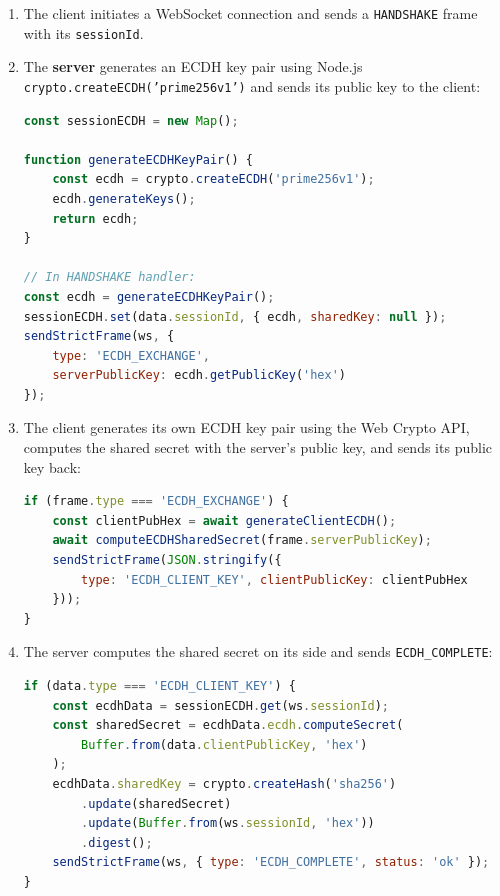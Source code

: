 \documentclass[12pt,a4paper]{article}
\begin{document}
\begin{enumerate}
    \item The client initiates a WebSocket connection and sends a \texttt{HANDSHAKE} frame with its \texttt{sessionId}.
    \item The \textbf{server} generates an ECDH key pair using Node.js \texttt{crypto.createECDH('prime256v1')} and sends its public key to the client:
    \begin{lstlisting}[language=JavaScript, caption=Server-side ECDH generation (server.js --- BEFORE PATCH)]
const sessionECDH = new Map();

function generateECDHKeyPair() {
    const ecdh = crypto.createECDH('prime256v1');
    ecdh.generateKeys();
    return ecdh;
}

// In HANDSHAKE handler:
const ecdh = generateECDHKeyPair();
sessionECDH.set(data.sessionId, { ecdh, sharedKey: null });
sendStrictFrame(ws, {
    type: 'ECDH_EXCHANGE',
    serverPublicKey: ecdh.getPublicKey('hex')
});
    \end{lstlisting}

    \item The client generates its own ECDH key pair using the Web Crypto API, computes the shared secret with the server's public key, and sends its public key back:
    \begin{lstlisting}[language=JavaScript, caption=Client-side ECDH with server (client.js --- BEFORE PATCH)]
if (frame.type === 'ECDH_EXCHANGE') {
    const clientPubHex = await generateClientECDH();
    await computeECDHSharedSecret(frame.serverPublicKey);
    sendStrictFrame(JSON.stringify({
        type: 'ECDH_CLIENT_KEY', clientPublicKey: clientPubHex
    }));
}
    \end{lstlisting}

    \item The server computes the shared secret on its side and sends \texttt{ECDH\_COMPLETE}:
    \begin{lstlisting}[language=JavaScript, caption=Server computes shared secret (server.js --- BEFORE PATCH)]
if (data.type === 'ECDH_CLIENT_KEY') {
    const ecdhData = sessionECDH.get(ws.sessionId);
    const sharedSecret = ecdhData.ecdh.computeSecret(
        Buffer.from(data.clientPublicKey, 'hex')
    );
    ecdhData.sharedKey = crypto.createHash('sha256')
        .update(sharedSecret)
        .update(Buffer.from(ws.sessionId, 'hex'))
        .digest();
    sendStrictFrame(ws, { type: 'ECDH_COMPLETE', status: 'ok' });
}
    \end{lstlisting}


\end{enumerate}
\end{document}

